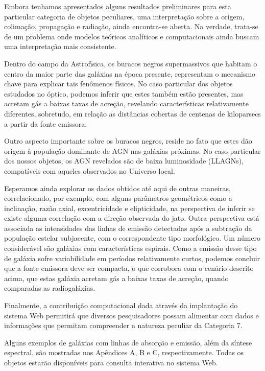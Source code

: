 Embora tenhamos apresentados alguns resultados preliminares para esta particular categoria de objetos peculiares, uma interpretação sobre a origem, colimação, propagação e radiação, ainda encontra-se aberta. Na verdade, trata-se de um problema onde modelos teóricos analíticos e computacionais ainda buscam uma interpretação mais consistente.

Dentro do campo da Astrofı́sica, os buracos negros supermassivos que habitam o centro da maior parte das galáxias na época presente, representam o mecanismo chave para explicar tais fenômenos físicos. No caso particular dos objetos estudados no óptico, podemos inferir que estes também estão presentes, mas acretam gás a baixas taxas de acreção, revelando características relativamente diferentes, sobretudo, em relação as distâncias cobertas de centenas de kiloparsecs a partir da fonte emissora.

Outro aspecto importante sobre os buracos negros, reside no fato que estes dão origem à população dominante de AGN nas 
galáxias próximas. No caso particular dos nossos objetos, os AGN revelados são de baixa luminosidade (LLAGNs), compatíveis 
com aqueles observados no Universo local.

Esperamos ainda explorar os dados obtidos até aqui de outras maneiras, correlacionado, por exemplo, com alguns parâmetros geométricos como a inclinação, razão axial, excentricidade e elipticidade, na perspectiva de inferir se existe alguma correlação com a direção observada do jato. Outra perspectiva está associada as intensidades das linhas de emissão detectadas após a subtração da população estelar subjacente, com o correspondente tipo morfológico. Um número considerável são galáxias com características espirais. Como a emissão desse tipo de galáxia sofre variabilidade em períodos relativamente curtos, podemos concluir que a fonte emissora  deve ser compacta, o que corrobora com o cenário descrito acima, que estas galáxia acretam gás a baixas taxas de acreção, quando comparadas as radiogaláxias.

Finalmente, a contribuição computacional dada através da implantação do sistema Web permitirá que diversos pesquisadores possam alimentar com dados e informações que permitam compreender a natureza peculiar da Categoria 7.

Alguns exemplos de galáxias com linhas de absorção e emissão, além da síntese espectral, são mostradas nos Apêndices A, B e C, respectivamente. Todas os objetos estarão disponíveis para consulta interativa no sistema Web.